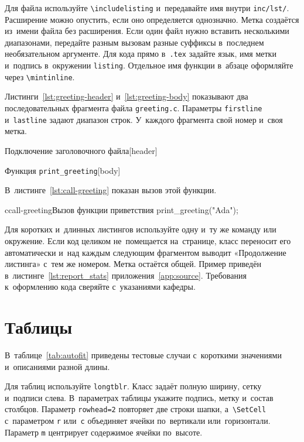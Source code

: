 \documentclass{bmstu}
\begin{document}
Для файла используйте \verb|\includelisting| и~передавайте имя внутри \texttt{inc/lst/}.
Расширение можно опустить, если оно определяется однозначно.
Метка создаётся из~имени файла без расширения.
Если один файл нужно вставить несколькими диапазонами, передайте разным вызовам разные суффиксы в~последнем необязательном аргументе.
Для кода прямо в~\texttt{.tex} задайте язык, имя метки и~подпись в~окружении \texttt{listing}.
Отдельное имя функции в~абзаце оформляйте через \verb|\mintinline|.

Листинги~\ref{lst:greeting-header} и~\ref{lst:greeting-body} показывают два последовательных фрагмента файла \texttt{greeting.c}.
Параметры \texttt{firstline} и~\texttt{lastline} задают диапазон строк.
У~каждого фрагмента свой номер и~своя метка.

    {Подключение заголовочного файла}[header]

    {Функция \texttt{print\_greeting}}[body]

В~листинге~\ref{lst:call-greeting} показан вызов этой функции.

\begin{listing}{c}{call-greeting}{Вызов функции приветствия}
print_greeting("Ada");
\end{listing}

Для коротких и~длинных листингов используйте одну и~ту же команду или окружение.
Если код целиком не~помещается на~странице, класс переносит его автоматически и~над каждым следующим фрагментом выводит «Продолжение листинга» с~тем же номером.
Метка остаётся общей.
Пример приведён в~листинге~\ref{lst:report_stats} приложения~\ref{app:source}.
Требования к~оформлению кода сверяйте с~указаниями кафедры.

\section{Таблицы}

В~таблице~\ref{tab:autofit} приведены тестовые случаи с~короткими значениями и~описаниями разной длины.

Для таблиц используйте \texttt{longtblr}.
Класс задаёт полную ширину, сетку и~подписи слева.
В~параметрах таблицы укажите подпись, метку и~состав столбцов.
Параметр \texttt{rowhead=2} повторяет две строки шапки, а~\verb|\SetCell| с~параметром \texttt{r} или~\texttt{c} объединяет ячейки по~вертикали или~горизонтали.
Параметр \texttt{m} центрирует содержимое ячейки по~высоте.
\end{document}

